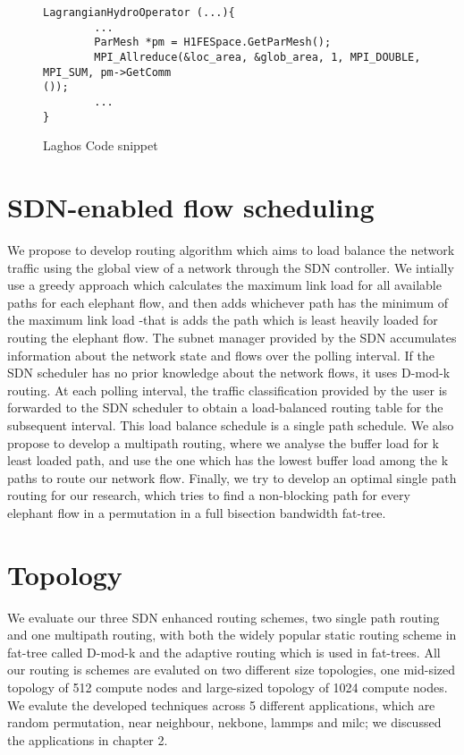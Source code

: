 \begin{figure}[hbtp]
\caption{Laghos Code snippet}
\label{code.laghos}
\begin{lstlisting}[breaklines]
LagrangianHydroOperator (...){
        ...
        ParMesh *pm = H1FESpace.GetParMesh();
        MPI_Allreduce(&loc_area, &glob_area, 1, MPI_DOUBLE, MPI_SUM, pm->GetComm
());
        ...
}
\end{lstlisting}
\end{figure}


\section{SDN-enabled flow scheduling}
We propose to develop routing algorithm which aims to load balance the network traffic using the 
global view of a network through the SDN controller.
We intially use a greedy approach which calculates the maximum link load for all available
paths for each elephant flow, and then adds whichever path has the minimum of the maximum link load 
-that is adds the path which is least heavily loaded for routing the elephant flow. 
The subnet manager provided by the SDN accumulates information
about the network state and flows over the polling interval. If the SDN
scheduler has no prior knowledge about the network flows, it uses D-mod-k routing.
At each polling interval, the traffic classification provided by the user is forwarded to the SDN scheduler 
to obtain a load-balanced routing table for the subsequent interval. This load balance schedule is a single 
path schedule. We also propose to develop a multipath routing, where we analyse the buffer load for k least loaded
path, and use the one which has the lowest buffer load among the k paths to route our network flow. Finally,
we try to develop an optimal single path routing for our research, which tries to find a non-blocking path for 
every elephant flow in a permutation in a full bisection bandwidth fat-tree.


\section{Topology}
We evaluate our three SDN enhanced routing schemes, two single path routing and one multipath
routing, with both the widely popular static routing scheme in fat-tree called D-mod-k and the adaptive 
routing which is used in fat-trees. All our routing is schemes are evaluted on two different size
topologies, one mid-sized topology of 512 compute nodes and large-sized topology of 1024 compute
nodes. We evalute the developed techniques across 5 different applications, which are random permutation,
near neighbour, nekbone, lammps and milc; we discussed the applications in chapter 2. 

